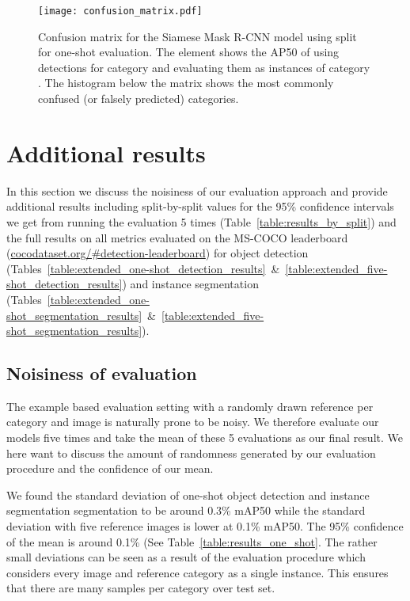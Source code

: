 \documentclass{article}
\newcommand{\coco}{MS-COCO\xspace}
\begin{document}
\begin{figure}[t!]
    \centering
    \texttt{[image: confusion\_matrix.pdf]}
    \caption{Confusion matrix for the Siamese Mask R-CNN model using split  for one-shot evaluation. The element  shows the AP50 of using detections for category  and evaluating them as instances of category . The histogram below the matrix shows the most commonly confused (or falsely predicted) categories.}
    \label{fig:confusion_matrix}
\end{figure}



\section{Additional results}
\label{appendix:additional_results}

In this section we discuss the noisiness of our evaluation approach and provide additional results including split-by-split values for the 95\% confidence intervals we get from running the evaluation 5 times (Table~\ref{table:results_by_split}) and the full results on all metrics evaluated on the \coco leaderboard (\url{cocodataset.org/\#detection-leaderboard}) for object detection (Tables~\ref{table:extended_one-shot_detection_results}~\&~\ref{table:extended_five-shot_detection_results}) and instance segmentation (Tables~\ref{table:extended_one-shot_segmentation_results}~\&~\ref{table:extended_five-shot_segmentation_results}).

\subsection{Noisiness of evaluation}

The example based evaluation setting with a randomly drawn reference per category and image is naturally prone to be noisy. We therefore evaluate our models five times and take the mean of these 5 evaluations as our final result. We here want to discuss the amount of randomness generated by our evaluation procedure and the confidence of our mean.

We found the standard deviation of one-shot object detection and instance segmentation segmentation to be around 0.3\% mAP50 while the standard deviation with five reference images is lower at 0.1\% mAP50. The 95\% confidence of the mean is around 0.1\% (See Table~\ref{table:results_one_shot}. The rather small deviations can be seen as a result of the evaluation procedure which considers every image and reference category as a single instance. This ensures that there are many samples per category over test set.
\end{document}
